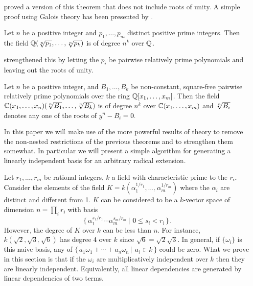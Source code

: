 {\Besicovitch} \cite{Besicovitch1940-iu} proved a version of this
theorem that does not include roots of unity.  A simple proof using
Galois theory has been presented by {\Richards} \cite{Richards1974-jl}.

\begin{proposition}
Let $n$ be a positive integer and $p_1, \ldots, p_m$ distinct positive
prime integers.  Then the field $\Q(\root n\of{p_1}, \ldots, \root
n\of{p_k})$ is of degree $n^k$ over $\mathbb{Q}$.
\end{proposition}

\noindent
{\Fateman} strengthened this by letting the $p_i$ be pairwise
relatively prime polynomials and leaving out the roots of unity.

\begin{proposition}
Let $n$ be a positive integer, and $B_1,\ldots, B_k$ be non-constant,
square-free pairwise relatively prime polynomials over the ring
$\mathbb{Q}[x_1, \ldots, x_m]$.  Then the field $\C(x_1, \ldots, x_n)(\root n
\of {B_1}, \ldots, \root n \of {B_k})$ is of degree $n^k$ over
$\mathbb{C}(x_1, \ldots, x_m)$ and $\root n \of {B_i}$ denotes any one of the
roots of $y^n - B_i = 0$.
\end{proposition}

In this paper we will make use of the more powerful results of
{\Kummer} theory to remove the non-nested restrictions of the previous
theorems and to strengthen them somewhat.  In particular we will
present a simple algorithm for generating a linearly independent basis
for an arbitrary radical extension.

\medskip
Let $r_1, \ldots, r_m$ be rational
integers, $k$ a field with characteristic prime to the $r_i$. Consider
the elements of the field $K = k(\alpha_1^{1/r_1}, \ldots,
\alpha_m^{1/r_m})$ where the $\alpha_i$ are distinct and different
from 1.  $K$ can be considered to be a $k$-vector space of dimension
$n = \prod_i r_i$ with basis
\[
\{\,\alpha_1^{s_1/r_1} \cdots \alpha_m^{s_m/r_m} \mid 0 \le s_i < r_i\,\}.
\]
However, the degree of $K$ over $k$ can be less than $n$.  For
instance, $k(\sqrt{2}, \sqrt{3}, \sqrt{6})$ has degree 4 over $k$
since $\sqrt{6} = \sqrt{2} \sqrt{3}$.  In general, if $\{\omega_i\}$
is this naive basis, any of $\{\,a_1 \omega_1 + \cdots + a_n \omega_n
\mid a_i \in k\,\}$ could be zero.  What we prove in this section is that
if the $\omega_i$ are multiplicatively independent over $k$ then they
are linearly independent.  Equivalently, all linear dependencies are
generated by linear dependencies of two terms.

